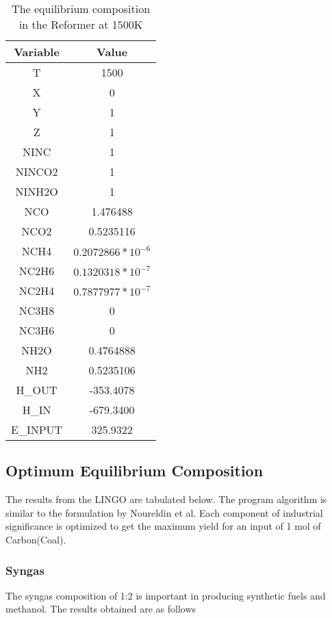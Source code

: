 \documentclass[journal=iecred,manuscript=article]{achemso}
\begin{document}
\FloatBarrier
\begin{table}[H]
\caption{The equilibrium composition in the Reformer at 1500K} 
\centering
\begin{tabular}{|c|c|}
\hline\hline %
Variable & Value \\ 
[1ex] %
\hline %
T	& 1500 \\
\hline
X	 & 0 \\
\hline
Y	& 1 \\
\hline
Z	& 1 \\
\hline
NINC	& 1 \\
\hline
NINCO2	& 1 \\
\hline
NINH2O	& 1 \\
\hline
NCO	&  1.476488 \\
\hline
NCO2	& 0.5235116 \\
\hline
NCH4 &	$0.2072866*10^{-6}$ \\
\hline
NC2H6	& $0.1320318*10^{-7}$ \\
\hline
NC2H4	& $0.7877977*10^{-7}$ \\
\hline
NC3H8	& 0 \\
\hline
NC3H6	& 0 \\
\hline
NH2O	& 0.4764888 \\
\hline
NH2 & 0.5235106 \\
\hline
H_{OUT}	& -353.4078 \\
\hline
H_{IN}	& -679.3400 \\
\hline
E_{INPUT}	& 325.9322 \\
\hline 

\end{tabular}
\end{table}
\FloatBarrier



\subsection{Optimum Equilibrium Composition}
The results from the LINGO\textsuperscript{\textregistered} are tabulated below. The program algorithm is similar to the formulation by Noureldin et al\cite{Nourel}. Each component of industrial significance is optimized to get the maximum yield for an input of 1 mol of Carbon(Coal). 

\newpage
\subsubsection{Syngas}
The syngas composition of 1:2 is important in producing synthetic fuels and methanol. The results obtained are as follows
\end{document}

